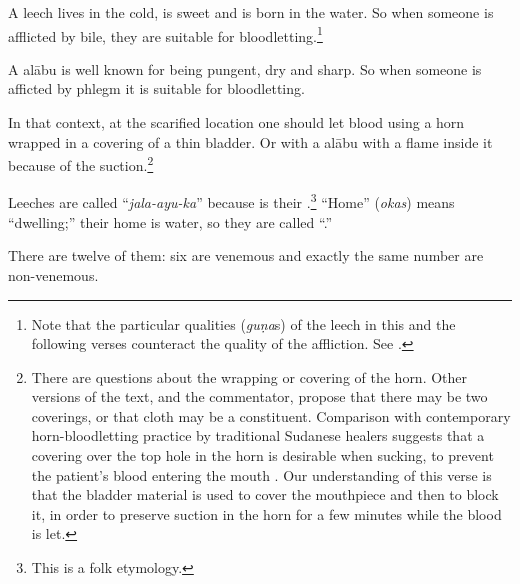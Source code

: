 \begin{translation}
\item[1.13.6]

A leech lives in the cold, is sweet and is born in the water. So when
someone is afflicted by bile, they are suitable for
bloodletting.\footnote{Note that the particular qualities (\emph{guṇa}s) of
    the leech in this and the following verses counteract the quality of the
    affliction.  See \cite[113, table 1]{broo-2018}.}

\item[1.13.7]

A \gls{alābu} is well known for being pungent, dry and sharp.  So
when someone is afficted by phlegm it is suitable for bloodletting.

\item[1.13.8]

In that context, at the scarified location one should let blood using a horn
wrapped in a covering of a thin bladder.  Or with a \gls{alābu} with a flame
inside it because of the suction.\footnote{There are questions about the
    wrapping or covering of the horn.  Other versions of the text, and the
    commentator, propose that there may be two coverings, or that cloth may be a
    constituent. Comparison with contemporary horn-bloodletting practice by
    traditional Sudanese healers suggests that a covering over the top hole in
    the horn is desirable when sucking, to prevent the patient's blood entering
    the mouth \citep{pbs-2020}.  Our understanding of this verse is that the
    bladder material is used to cover the mouthpiece and then to block it, in
    order to preserve suction in the horn for a few minutes while the blood is
    let. }

\item[1.13.9]

Leeches are called “\emph{jala-ayu-ka}” because  is their 
.\footnote{This is a folk etymology.} “Home” (\emph{okas}) means 
“{dwelling};” their 
home is water, so they are called “.”

\item[1.13.10]

There are twelve of them: six are venemous and exactly the same number are 
non-venemous. 


\end{translation}
